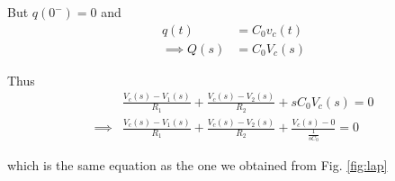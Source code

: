 \documentclass[journal,12pt,twocolumn]{IEEEtran}
\numberwithin{equation}{section}
\numberwithin{figure}{section}
\renewcommand\thesection{\arabic{section}}
\begin{document}
\begin{enumerate}[label=\thesection.\arabic*.,ref=\thesection.\theenumi]
	But $q(0^-) = 0$ and 
	\begin{align}
		q(t) &= C_0v_c(t) \\
		\implies Q(s) &= C_0V_c(s)
	\end{align}
	
	Thus
	\begin{align}
		&\frac{V_c(s) - V_1(s)}{R_1} + \frac{V_c(s) - V_2(s)}{R_2} + sC_0V_c(s) = 0 \\
		\implies &\frac{V_c(s) - V_1(s)}{R_1} + 	\frac{V_c(s) - V_2(s)}{R_2} + \frac{V_c(s) - 0}{\frac{1}{sC_0}} = 0 
	\end{align}
	
	which is the same equation as the one we obtained from Fig. \ref{fig:lap}
	
	\end{enumerate}
	
	
\end{document}
